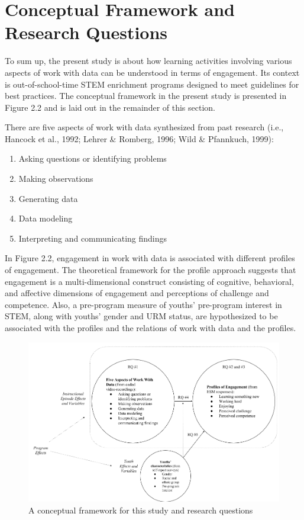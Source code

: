 \documentclass[]{book}
\providecommand{\tightlist}{%
  \setlength{\itemsep}{0pt}\setlength{\parskip}{0pt}}
\theoremstyle{definition}
\theoremstyle{definition}
\theoremstyle{definition}
\theoremstyle{remark}
\begin{document}
\section{Conceptual Framework and Research
Questions}\label{conceptual-framework-and-research-questions}

To sum up, the present study is about how learning activities involving
various aspects of work with data can be understood in terms of
engagement. Its context is out-of-school-time STEM enrichment programs
designed to meet guidelines for best practices. The conceptual framework
in the present study is presented in Figure 2.2 and is laid out in the
remainder of this section.

There are five aspects of work with data synthesized from past research
(i.e., Hancock et al., 1992; Lehrer \& Romberg, 1996; Wild \& Pfannkuch,
1999):

\begin{enumerate}
\def\labelenumi{\arabic{enumi}.}
\tightlist
\item
  Asking questions or identifying problems
\item
  Making observations
\item
  Generating data
\item
  Data modeling
\item
  Interpreting and communicating findings
\end{enumerate}

In Figure 2.2, engagement in work with data is associated with different
profiles of engagement. The theoretical framework for the profile
approach suggests that engagement is a multi-dimensional construct
consisting of cognitive, behavioral, and affective dimensions of
engagement and perceptions of challenge and competence. Also, a
pre-program measure of youths' pre-program interest in STEM, along with
youths' gender and URM status, are hypothesized to be associated with
the profiles and the relations of work with data and the profiles.

\begin{figure}

{\centering \includegraphics[width=0.8\linewidth]{images/figure2} 

}

\caption{A conceptual framework for this study and research questions}\label{fig:unnamed-chunk-2}
\end{figure}
\end{document}
